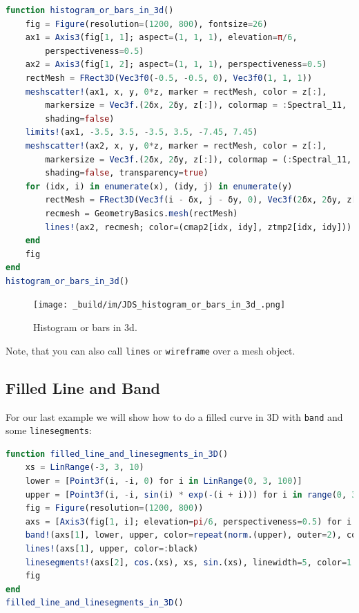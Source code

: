 \documentclass[
  notoc %
]{tufte-book}
\newcommand{\passthrough}[1]{#1}
\begin{document}
\begin{lstlisting}[language=Julia]
function histogram_or_bars_in_3d()
    fig = Figure(resolution=(1200, 800), fontsize=26)
    ax1 = Axis3(fig[1, 1]; aspect=(1, 1, 1), elevation=π/6,
        perspectiveness=0.5)
    ax2 = Axis3(fig[1, 2]; aspect=(1, 1, 1), perspectiveness=0.5)
    rectMesh = FRect3D(Vec3f0(-0.5, -0.5, 0), Vec3f0(1, 1, 1))
    meshscatter!(ax1, x, y, 0*z, marker = rectMesh, color = z[:],
        markersize = Vec3f.(2δx, 2δy, z[:]), colormap = :Spectral_11,
        shading=false)
    limits!(ax1, -3.5, 3.5, -3.5, 3.5, -7.45, 7.45)
    meshscatter!(ax2, x, y, 0*z, marker = rectMesh, color = z[:],
        markersize = Vec3f.(2δx, 2δy, z[:]), colormap = (:Spectral_11, 0.25),
        shading=false, transparency=true)
    for (idx, i) in enumerate(x), (idy, j) in enumerate(y)
        rectMesh = FRect3D(Vec3f(i - δx, j - δy, 0), Vec3f(2δx, 2δy, z[idx, idy]))
        recmesh = GeometryBasics.mesh(rectMesh)
        lines!(ax2, recmesh; color=(cmap2[idx, idy], ztmp2[idx, idy]))
    end
    fig
end
histogram_or_bars_in_3d()
\end{lstlisting}

\begin{figure}
\hypertarget{fig:histogram_or_bars_in_3d}{%
\centering
\texttt{[image: \_build/im/JDS\_histogram\_or\_bars\_in\_3d\_.png]}
\caption{Histogram or bars in 3d.}\label{fig:histogram_or_bars_in_3d}
}
\end{figure}

Note, that you can also call \passthrough{\lstinline!lines!} or
\passthrough{\lstinline!wireframe!} over a mesh object.

\hypertarget{filled-line-and-band}{%
\subsection{Filled Line and Band}\label{filled-line-and-band}}

For our last example we will show how to do a filled curve in 3D with
\passthrough{\lstinline!band!} and some
\passthrough{\lstinline!linesegments!}:

\begin{lstlisting}[language=Julia]
function filled_line_and_linesegments_in_3D()
    xs = LinRange(-3, 3, 10)
    lower = [Point3f(i, -i, 0) for i in LinRange(0, 3, 100)]
    upper = [Point3f(i, -i, sin(i) * exp(-(i + i))) for i in range(0, 3, length=100)]
    fig = Figure(resolution=(1200, 800))
    axs = [Axis3(fig[1, i]; elevation=pi/6, perspectiveness=0.5) for i = 1:2]
    band!(axs[1], lower, upper, color=repeat(norm.(upper), outer=2), colormap=:CMRmap)
    lines!(axs[1], upper, color=:black)
    linesegments!(axs[2], cos.(xs), xs, sin.(xs), linewidth=5, color=1:length(xs))
    fig
end
filled_line_and_linesegments_in_3D()
\end{lstlisting}
\end{document}
